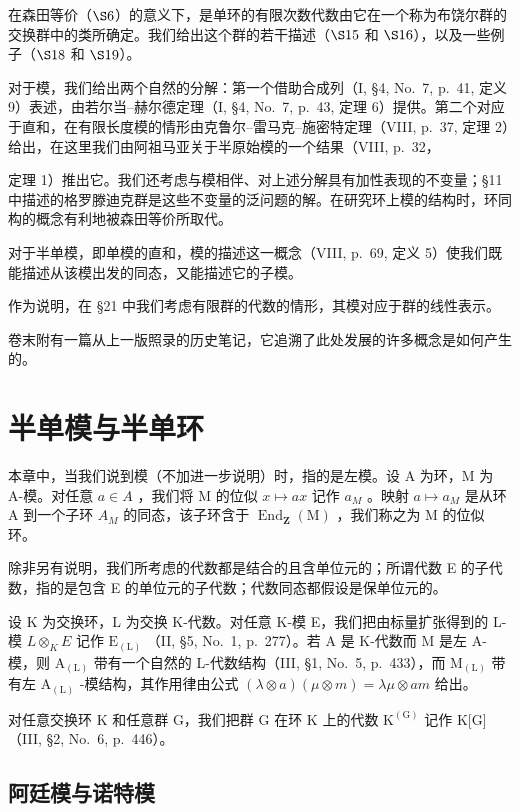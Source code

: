 在森田等价（\(\S6\)）的意义下，是单环的有限次数代数由它在一个称为布饶尔群的交换群中的类所确定。我们给出这个群的若干描述（\(\S15\) 和 \(\S16\)），以及一些例子（\(\S18\) 和 \(\S19\)）。

对于模，我们给出两个自然的分解：第一个借助合成列（I, §4, No.~7, p.~41, 定义 9）表述，由若尔当--赫尔德定理（I, §4, No.~7, p.~43, 定理 6）提供。第二个对应于直和，在有限长度模的情形由克鲁尔--雷马克--施密特定理（VIII, p.~37, 定理 2）给出，在这里我们由阿祖马亚关于半原始模的一个结果（VIII, p.~32，

定理 1）推出它。我们还考虑与模相伴、对上述分解具有加性表现的不变量；§11 中描述的格罗滕迪克群是这些不变量的泛问题的解。在研究环上模的结构时，环同构的概念有利地被森田等价所取代。

对于半单模，即单模的直和，模的描述这一概念（VIII, p.~69, 定义 5）使我们既能描述从该模出发的同态，又能描述它的子模。

作为说明，在 §21 中我们考虑有限群的代数的情形，其模对应于群的线性表示。

卷末附有一篇从上一版照录的历史笔记，它追溯了此处发展的许多概念是如何产生的。

\BourbakiMainMatter
\setcounter{chapter}{7}
\chapter{半单模与半单环}

本章中，当我们说到模（不加进一步说明）时，指的是左模。设 A 为环，M 为 A-模。对任意 \(a \in A\) ，我们将 M 的位似 \(x \mapsto ax\) 记作 \(a_{M}\) 。映射 \(a \mapsto a_{M}\) 是从环 A 到一个子环 \(A_{M}\) 的同态，该子环含于 \(\operatorname{End}_{\mathbf{Z}}(\mathrm{M})\) ，我们称之为 M 的位似环。

除非另有说明，我们所考虑的代数都是结合的且含单位元的；所谓代数 E 的子代数，指的是包含 E 的单位元的子代数；代数同态都假设是保单位元的。

设 K 为交换环，L 为交换 K-代数。对任意 K-模 E，我们把由标量扩张得到的 L-模 \(L \otimes_{K} E\) 记作 \(\mathrm{E}_{(\mathrm{L})}\) （II, §5, No.~1, p.~277）。若 A 是 K-代数而 M 是左 A-模，则 \(\mathrm{A}_{(\mathrm{L})}\) 带有一个自然的 L-代数结构（III, §1, No.~5, p.~433），而 \(\mathrm{M}_{(\mathrm{L})}\) 带有左 \(\mathrm{A}_{(\mathrm{L})}\) -模结构，其作用律由公式 \((\lambda \otimes a)(\mu \otimes m) = \lambda \mu \otimes am\) 给出。

对任意交换环 K 和任意群 G，我们把群 G 在环 K 上的代数 \(\mathrm{K}^{(\mathrm{G})}\) 记作 K{[}G{]} （III, §2, No.~6, p.~446）。

\section{阿廷模与诺特模}

